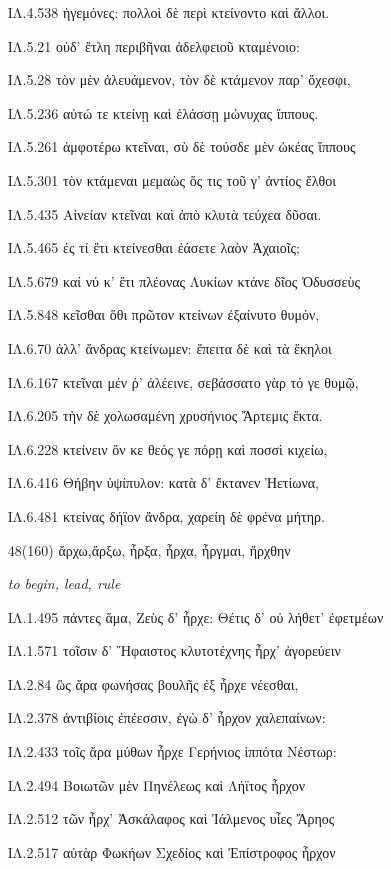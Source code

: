 \begin{enumerate}
{ΙΛ.4.538 ἡγεμόνες: πολλοὶ δὲ περὶ κτείνοντο καὶ ἄλλοι.

ΙΛ.5.21 οὐδ' ἔτλη περιβῆναι ἀδελφειοῦ κταμένοιο:

ΙΛ.5.28 τὸν μὲν ἀλευάμενον, τὸν δὲ κτάμενον παρ' ὄχεσφι,

ΙΛ.5.236 αὐτώ τε κτείνῃ καὶ ἐλάσσῃ μώνυχας ἵππους.

ΙΛ.5.261 ἀμφοτέρω κτεῖναι, σὺ δὲ τούσδε μὲν ὠκέας ἵππους

ΙΛ.5.301 τὸν κτάμεναι μεμαὼς ὅς τις τοῦ γ' ἀντίος ἔλθοι

ΙΛ.5.435 Αἰνείαν κτεῖναι καὶ ἀπὸ κλυτὰ τεύχεα δῦσαι.

ΙΛ.5.465 ἐς τί ἔτι κτείνεσθαι ἐάσετε λαὸν Ἀχαιοῖς;

ΙΛ.5.679 καί νύ κ' ἔτι πλέονας Λυκίων κτάνε δῖος Ὀδυσσεὺς

ΙΛ.5.848 κεῖσθαι ὅθι πρῶτον κτείνων ἐξαίνυτο θυμόν,

ΙΛ.6.70 ἀλλ' ἄνδρας κτείνωμεν: ἔπειτα δὲ καὶ τὰ ἕκηλοι

ΙΛ.6.167 κτεῖναι μέν ῥ' ἀλέεινε, σεβάσσατο γὰρ τό γε θυμῷ,

ΙΛ.6.205 τὴν δὲ χολωσαμένη χρυσήνιος Ἄρτεμις ἔκτα.

ΙΛ.6.228 κτείνειν ὅν κε θεός γε πόρῃ καὶ ποσσὶ κιχείω,

ΙΛ.6.416 Θήβην ὑψίπυλον: κατὰ δ' ἔκτανεν Ἠετίωνα,

ΙΛ.6.481 κτείνας δήϊον ἄνδρα, χαρείη δὲ φρένα μήτηρ.
}

\clearpage
\item[\large 48(160)]{\large\g ἄρχω,ἄρξω, ἦρξα, ἦρχα, ἦργμαι, ἤρχθην}

\hspace{0.2cm} \textit{ to begin, lead, rule}

{\g
ΙΛ.1.495 πάντες ἅμα, Ζεὺς δ' ἦρχε: Θέτις δ' οὐ λήθετ' ἐφετμέων

ΙΛ.1.571 τοῖσιν δ' Ἥφαιστος κλυτοτέχνης ἦρχ' ἀγορεύειν

ΙΛ.2.84 ὣς ἄρα φωνήσας βουλῆς ἐξ ἦρχε νέεσθαι,

ΙΛ.2.378 ἀντιβίοις ἐπέεσσιν, ἐγὼ δ' ἦρχον χαλεπαίνων:

ΙΛ.2.433 τοῖς ἄρα μύθων ἦρχε Γερήνιος ἱππότα Νέστωρ:

ΙΛ.2.494 Βοιωτῶν μὲν Πηνέλεως καὶ Λήϊτος ἦρχον

ΙΛ.2.512 τῶν ἦρχ' Ἀσκάλαφος καὶ Ἰάλμενος υἷες Ἄρηος

ΙΛ.2.517 αὐτὰρ Φωκήων Σχεδίος καὶ Ἐπίστροφος ἦρχον

}
\end{enumerate}
